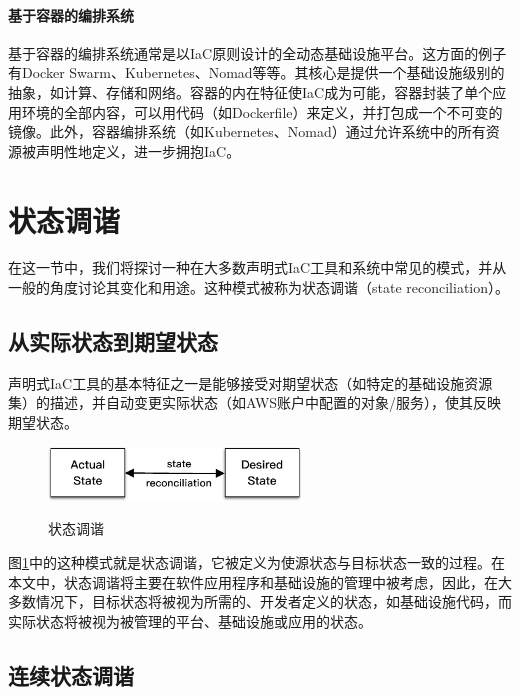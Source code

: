 \documentclass[macfonts,master]{njuthesis}
\begin{document}
\paragraph{基于容器的编排系统}

基于容器的编排系统通常是以IaC原则设计的全动态基础设施平台。这方面的例子有Docker Swarm、Kubernetes、Nomad等等。其核心是提供一个基础设施级别的抽象，如计算、存储和网络。容器的内在特征使IaC成为可能，容器封装了单个应用环境的全部内容，可以用代码（如Dockerfile）来定义，并打包成一个不可变的镜像。此外，容器编排系统（如Kubernetes、Nomad）通过允许系统中的所有资源被声明性地定义，进一步拥抱IaC。

\section{状态调谐}\label{section:reconciliation}

在这一节中，我们将探讨一种在大多数声明式IaC工具和系统中常见的模式，并从一般的角度讨论其变化和用途。这种模式被称为状态调谐（state reconciliation）。

\subsection{从实际状态到期望状态}

声明式IaC工具的基本特征之一是能够接受对期望状态（如特定的基础设施资源集）的描述，并自动变更实际状态（如AWS账户中配置的对象/服务），使其反映期望状态。

\begin{figure}[htbp]
  \centering
  \includegraphics[width=0.6\textwidth]{pics/simple-state-reconciliation.pdf}\\
  \caption{状态调谐}\label{fig:ssr}
\end{figure}

图\ref{fig:ssr}中的这种模式就是状态调谐，它被定义为使源状态与目标状态一致的过程。在本文中，状态调谐将主要在软件应用程序和基础设施的管理中被考虑，因此，在大多数情况下，目标状态将被视为所需的、开发者定义的状态，如基础设施代码，而实际状态将被视为被管理的平台、基础设施或应用的状态。

\subsection{连续状态调谐}\label{section:continus-reconciliation}
\end{document}
